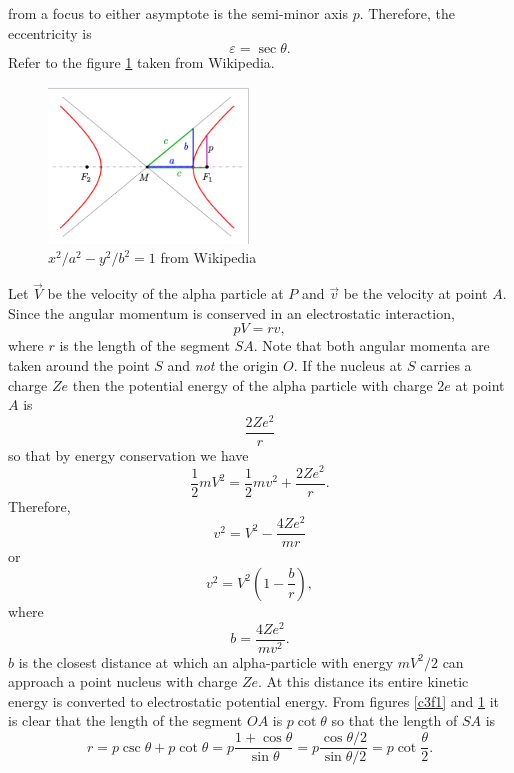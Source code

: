 from a focus to either asymptote is the semi-minor axis $p$. Therefore, the
eccentricity is
\begin{equation}\label{c3s2e2}
\varepsilon = \sec\theta.
\end{equation}
Refer to the figure \ref{c3f2} taken from Wikipedia.
\begin{figure}
\begin{center}
\includegraphics{hyperbola}
\caption{$x^2/a^2 - y^2/b^2 = 1$ from Wikipedia}\label{c3f2}
\end{center}
\end{figure}
Let $\vec{V}$ be the velocity of the alpha particle at $P$ and $\vec{v}$ be the
velocity at point $A$. Since the angular momentum is conserved in an 
electrostatic interaction,
\begin{equation}\label{c3s2e3}
pV = rv,
\end{equation}
where $r$ is the length of the segment $SA$. Note that both angular momenta are
taken around the point $S$ and \emph{not} the origin $O$. If the nucleus at $S$
carries a charge $Ze$ then the potential energy of the alpha particle with
charge $2e$ at point $A$ is
\[
\frac{2Ze^2}{r}
\]
so that by energy conservation we have
\begin{equation}\label{c3s2e4}
\frac{1}{2}mV^2 = \frac{1}{2}mv^2 + \frac{2Ze^2}{r}.
\end{equation}
Therefore,
\[
v^2 = V^2 - \frac{4Ze^2}{mr}
\]
or
\begin{equation}\label{c3s2e5}
v^2 = V^2\left(1 - \frac{b}{r}\right),
\end{equation}
where
\begin{equation}\label{c3s2e6}
b = \frac{4Ze^2}{mv^2}.
\end{equation}
$b$ is the closest distance at which an alpha-particle with energy $mV^2/2$
can approach a point nucleus with charge $Ze$. At this distance its entire 
kinetic energy is converted to electrostatic potential energy. From figures
\ref{c3f1} and \ref{c3f2} it is clear that the length of the segment $OA$ is
$p\cot\theta$ so that the length of $SA$ is
\begin{equation}\label{c3s2e7}
r = p\csc\theta + p\cot\theta = p\frac{1 + \cos\theta}{\sin\theta} =
p\frac{\cos\theta/2}{\sin\theta/2} = p\cot\frac{\theta}{2}.
\end{equation}
